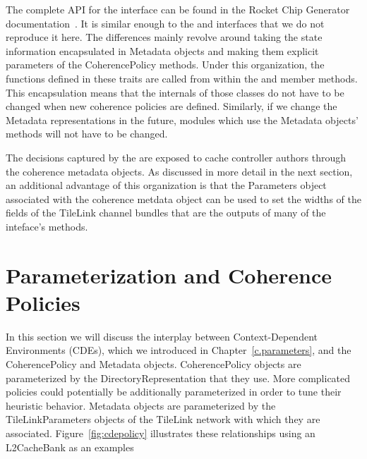 The complete API for the  interface can be found in the
Rocket Chip Generator documentation~\cite{rocket}.
It is similar enough to the  and  interfaces that
we do not reproduce it here.
The differences mainly revolve around taking the state information encapsulated
in Metadata objects and making them explicit parameters of the CoherencePolicy methods.
Under this organization, the functions defined in these traits
are called from within the  and  member methods.
This encapsulation means that the internals of those classes do not have to be changed
when new coherence policies are defined.
Similarly, if we change the Metadata representations in the future,
modules which use the Metadata objects' methods will not have to be changed.

The decisions captured by the  are exposed to cache controller authors through
the coherence metadata objects.
As discussed in more detail in the next section,
an additional advantage of this organization is that the Parameters object
associated with the coherence metdata object can be used to set the widths of the fields of the
TileLink channel bundles that are the outputs of many of the inteface's methods.

\section{Parameterization and Coherence Policies}

In this section we will discuss the interplay between Context-Dependent Environments (CDEs),
which we introduced in Chapter~\ref{c.parameters},
and the CoherencePolicy and Metadata objects.
CoherencePolicy objects are parameterized by the DirectoryRepresentation that they use.
More complicated policies could potentially be additionally parameterized in order to tune their heuristic behavior.
Metadata objects are parameterized by the TileLinkParameters objects of the TileLink network with which they are associated.
Figure~\ref{fig:cdepolicy} illustrates these relationships using an L2CacheBank as an examples

